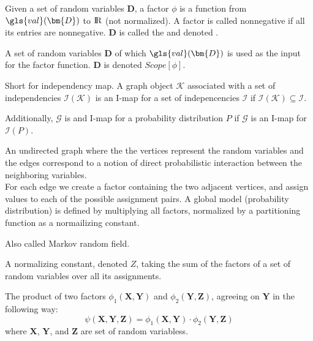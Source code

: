 \DeclareMathOperator*{\realnumbers}{{\rm I\!R}}


{%
  Given a \gls{set of random variables} $\bm{D}$, a factor $\phi$ is a function from $\gls{val}(\bm{D})$ to $\realnumbers$ (not normalized). A factor is called nonnegative if all its entries are nonnegative. $\bm{D}$ is called the  and denoted .
}

{%
  A \gls{set of random variables} $\bm{D}$ of which $\gls{val}(\bm{D})$ is used as the input for the \gls{factor} function. $\bm{D}$ is denoted $Scope[\phi]$.
}

{%
  Short for independency map. A graph object $\mathcal{K}$ associated with a \gls{set of independencies} $\mathcal{I}(\mathcal{K})$ is an I-map for a set of indepencencies $\mathcal{I}$ if $\mathcal{I}(\mathcal{K})\subseteq\mathcal{I}$.

  Additionally, $\mathcal{G}$ is and I-map for a \gls{probability distribution} $P$ if $\mathcal{G}$ is an I-map for $\mathcal{I}(P)$.

}

{%
  An undirected graph where the the vertices represent the \glspl{random variable} and the edges correspond to a notion of direct probabilistic interaction between the neighboring variables.\\

  For each edge we create a \gls{factor} containing the two adjacent vertices, and assign values to each of the possible assignment pairs. A global model (probability distribution) is defined by multiplying all factors, normalized by a \gls{partitioning function} as a normailizing constant.

  Also called Markov random field.

}

{%
  A normalizing constant, denoted $Z$, taking the sum of the \glspl{factor} of a \gls{set of random variables} over all its assignments.
}

{%
  The product of two \glspl{factor} $\phi_1(\bm{X},\bm{Y})$ and $\phi_2(\bm{Y},\bm{Z})$, agreeing on $\bm{Y}$ in the following way:
  \begin{equation*}
    \psi(\bm{X},\bm{Y},\bm{Z})=\phi_1(\bm{X},\bm{Y})\cdot\phi_2(\bm{Y},\bm{Z})
  \end{equation*}
  where $\bm{X}$, $\bm{Y}$, and $\bm{Z}$ are \glspl{set of random variables}.
}

